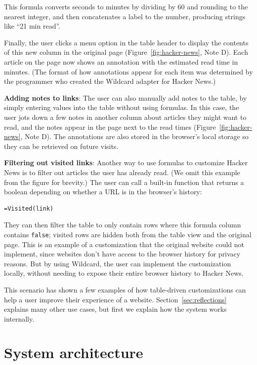 \documentclass[sigplan,screen,10pt,anonymous,review]{acmart}
\begin{document}
This formula converts seconds to minutes by dividing by 60 and rounding
to the nearest integer, and then concatenates a label to the number,
producing strings like ``21 min read''.

Finally, the user clicks a menu option in the table header to display
the contents of this new column in the original page
(Figure~\ref{fig:hacker-news}, Note D). Each article on the page now
shows an annotation with the estimated read time in minutes. (The format
of how annotations appear for each item was determined by the programmer
who created the Wildcard adapter for Hacker News.)

\textbf{Adding notes to links}: The user can also manually add notes to
the table, by simply entering values into the table without using
formulas. In this case, the user jots down a few notes in another column
about articles they might want to read, and the notes appear in the page
next to the read times (Figure~\ref{fig:hacker-news}, Note D). The
annotations are also stored in the browser's local storage so they can
be retrieved on future visits.

\textbf{Filtering out visited links}: Another way to use formulas to
customize Hacker News is to filter out articles the user has already
read. (We omit this example from the figure for brevity.) The user can
call a built-in function that returns a boolean depending on whether a
URL is in the browser's history:

\begin{verbatim}
=Visited(link)
\end{verbatim}

They can then filter the table to only contain rows where this formula
column contains \texttt{false}; visited rows are hidden both from the
table view and the original page. This is an example of a customization
that the original website could not implement, since websites don't have
access to the browser history for privacy reasons. But by using
Wildcard, the user can implement the customization locally, without
needing to expose their entire browser history to Hacker News.

This scenario has shown a few examples of how table-driven
customizations can help a user improve their experience of a website.
Section~\ref{sec:reflections} explains many other use cases, but first
we explain how the system works internally.

\hypertarget{sec:architecture}{%
\section{System architecture}\label{sec:architecture}}
\end{document}
